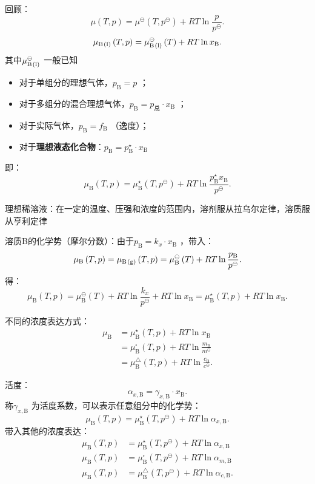 回顾：
\[
    \mu\left( T,p \right) = \mu^\ominus\left( T,p^\ominus \right)+RT\ln \frac{p}{p^\ominus}
.\]
\[
    \mu_{\ce{B(l)}}\left( T,p \right) = \mu^\ominus_{\ce{B(l)}}\left( T \right)+RT\ln x_\text{B}
.\]
其中$\mu^\ominus_{\ce{B(l)}}$ 一般已知
\begin{itemize}
    \item 对于单组分的理想气体，$p_\text{B} = p$ ；
    \item 对于多组分的混合理想气体，$p_\text{B} = p_\text{总}\cdot x_\text{B}$ ；
    \item 对于实际气体，$p_\text{B} = f_\text{B}$ （逸度）；
    \item 对于\textbf{理想液态化合物}：$p_\text{B} = p_\text{B}^\star \cdot x_\text{B}$
\end{itemize}
即：\[
    \mu_\text{B}\left( T,p \right) = \mu_\text{B}^\star \left( T,p^\ominus \right)+RT\ln \frac{p_\text{B}^\star x_\text{B}}{p^\ominus}
.\]
\begin{notation}
    理想稀溶液：在一定的温度、压强和浓度的范围内，溶剂服从拉乌尔定律，溶质服从亨利定律

    溶质B的化学势（摩尔分数）：由于$p_\text{B} = k_{x}\cdot x_\text{B}$ ，带入：\[
        \mu_\text{B}\left( T,p \right) = \mu_{\ce{B(g)}}\left( T,p \right) = \mu_\text{B}^\ominus\left( T \right)+RT\ln \frac{p_\text{B}}{p^\ominus}
    .\]
    得：\[
        \mu_\text{B}\left( T,p \right) = \mu_\text{B}^\ominus\left( T \right) + RT\ln \frac{k_{x}}{p^\ominus}+RT\ln x_\text{B} = \mu_\text{B}^\star \left( T,p \right)+RT\ln x_\text{B}
    .\]
\end{notation}
不同的浓度表达方式：
\begin{align*}
    \mu_\text{B} &= \mu_\text{B}^\star \left( T,p \right)+RT\ln x_\text{B} \\
    &= \mu_\text{B}^\square\left( T,p \right)+RT\ln \frac{m_\text{B}}{m^\ominus} \\
    &= \mu_\text{B}^\triangle\left( T,p \right)+RT\ln \frac{c_\text{B}}{c^\ominus}
.\end{align*}
\begin{notation}
    活度： \[
        \alpha_{x,\text{B}} = \gamma_{x,\text{B}}\cdot x_\text{B}
    .\]
    称$\gamma_{x,\text{B}}$ 为活度系数，可以表示任意组分中的化学势：\[
        \mu_\text{B}\left( T,p \right) = \mu_\text{B}^\star \left( T,p^\ominus \right) + RT\ln \alpha_{x,\text{B}}
    .\]
    带入其他的浓度表达：
    \begin{align*}
        \mu_\text{B}\left( T,p \right) &= \mu_\text{B}^\star \left( T,p^\ominus \right) + RT\ln \alpha_{x,\text{B}}\\
        \mu_\text{B}\left( T,p \right) &= \mu_\text{B}^\square \left( T,p^\ominus \right) + RT\ln \alpha_{m,\text{B}} \\
        \mu_\text{B}\left( T,p \right) &= \mu_\text{B}^\triangle \left( T,p^\ominus \right) + RT\ln \alpha_{c,\text{B}}
    .\end{align*}
\end{notation}
